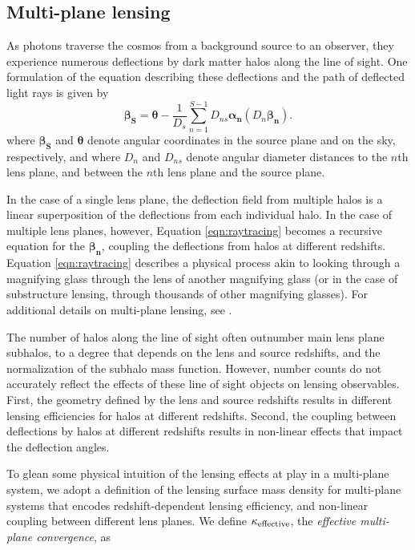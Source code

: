 \subsection{Multi-plane lensing}
\label{ssec:multplane}
As photons traverse the cosmos from a background source to an observer, they experience numerous deflections by dark matter halos along the line of sight. One formulation of the equation describing these deflections and the path of deflected light rays is given by \cite{Schnedier1997}
\begin{equation}
\label{eqn:raytracing}
\boldsymbol{\beta_S} = \boldsymbol{\theta} - \frac{1}{D_s} \sum_{n=1}^{S-1} D_{ns}{\boldsymbol{\alpha_n}} \left(D_n \boldsymbol{\beta_n}\right).
\end{equation}
where $\boldsymbol{\beta_S}$ and $\boldsymbol{\theta}$ denote angular coordinates in the source plane and on the sky, respectively, and where $D_n$ and $D_{ns}$ denote angular diameter distances to the $n$th lens plane, and between the $n$th lens plane and the source plane. 

In the case of a single lens plane, the deflection field from multiple halos is a linear superposition of the deflections from each individual halo. In the case of multiple lens planes, however, Equation \ref{eqn:raytracing} becomes a recursive equation for the $\boldsymbol{\beta_n}$, coupling the deflections from halos at different redshifts. Equation \ref{eqn:raytracing} describes a physical process akin to looking through a magnifying glass through the lens of another magnifying glass (or in the case of substructure lensing, through thousands of other magnifying glasses). For additional details on multi-plane lensing, see \cite{Schneider++92}. 

The number of halos along the line of sight often outnumber main lens plane subhalos, to a degree that depends on the lens and source redshifts, and the normalization of the subhalo mass function. However, number counts do not accurately reflect the effects of these line of sight objects on lensing observables. First, the geometry defined by the lens and source redshifts results in different lensing efficiencies for halos at different redshifts. Second, the coupling between deflections by halos at different redshifts results in non-linear effects that impact the deflection angles. 

To glean some physical intuition of the lensing effects at play in a multi-plane system, we adopt a definition of the lensing surface mass density for multi-plane systems that encodes redshift-dependent lensing efficiency, and non-linear coupling between different lens planes. We define $\kappa_{\rm{effective}}$, the \textit{effective multi-plane convergence}, as

